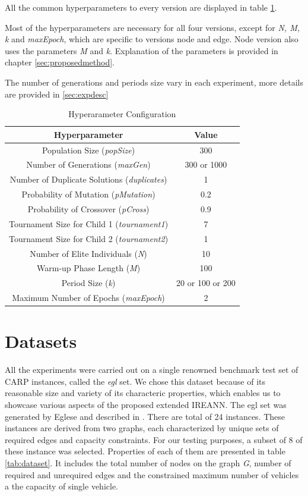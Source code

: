 \documentclass[twoside]{ctuthesis}
\theoremstyle{plain}
\theoremstyle{definition}
\theoremstyle{note}
\begin{document}
All the common hyperparameters to every version are displayed in table \ref{tab:params}. 

Most of the hyperparameters are necessary for all four versions, except for \emph{N, M, k} and \emph{maxEpoch}, which are specific to versions node and edge. Node version also uses the parameters \emph{M} and \emph{k}. Explanation of the parameters is provided in chapter \ref{sec:proposedmethod}.

The number of generations and periods size vary in each experiment, more details are provided in \ref{sec:expdesc}

\begin{table}[htbp]
	\centering
	\caption{Hyperarameter Configuration}
	\label{tab:params}
	\begin{tabular}{cc}
		\hline
		\textbf{Hyperparameter} & \textbf{Value} \\
		\hline
		Population Size (\emph{popSize}) & 300 \\
		Number of Generations (\emph{maxGen}) & 300 or 1000 \\
		Number of Duplicate Solutions (\emph{duplicates}) & 1 \\
		Probability of Mutation (\emph{pMutation}) & 0.2 \\
		Probability of Crossover (\emph{pCross}) & 0.9 \\
		Tournament Size for Child 1 (\emph{tournament1}) & 7 \\
		Tournament Size for Child 2 (\emph{tournament2}) & 1 \\
		Number of Elite Individuals (\emph{N}) & 10 \\
		Warm-up Phase Length (\emph{M}) & 100 \\
		Period Size (\emph{k}) & 20 or 100 or 200 \\
		Maximum Number of Epochs (\emph{maxEpoch}) & 2 \\
		\hline
	\end{tabular}
\end{table}


\section{Datasets}
All the experiments were carried out on a single renowned benchmark test set of CARP instances, called the \emph{egl} set. We chose this dataset because of its reasonable size and variety of its characteric properties, which enables us to showcase various aspects of the proposed extended IREANN. The egl set was generated by Eglese and described in \cite{EGLESE1994231}. There are total of 24 instances. These instances are derived from two graphs, each characterized by unique sets of required edges and capacity constraints. For our testing purposes, a subset of 8 of these instance was selected. Properties of each of them are presented in table \ref{tab:dataset}. It includes the total number of nodes on the graph \emph{G}, number of required and unrequired edges and the constrained maximum number of vehicles a the capacity of single vehicle.
\end{document}
